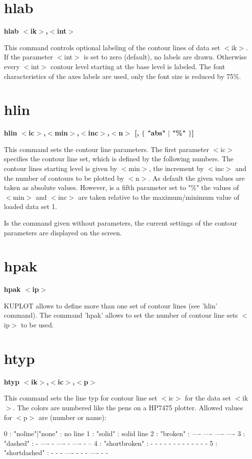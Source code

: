 \section{hlab}
{\bf hlab $ <$ik$> $,$ <$int$> $ \par }
\par
\vspace{3pt}
This command controls optional labeling of the contour lines of 
data set $ <$ik$> $. If the parameter $ <$int$> $ is set to zero (default), no 
labels are drawn. Otherwise every $ <$int$> $ contour level starting at 
the base level is labeled. The font characteristics of the axes 
labels are used, only the font size is reduced by 75\%. 
\section{hlin}
{\bf hlin $ <$ic$> $,$ <$min$> $,$ <$inc$> $,$ <$n$> $ [, $ \{$ "abs" $| $ "\%" $\} $] \par }
\par
\vspace{3pt}
This command sets the contour line parameters. The first parameter 
$ <$ic$> $ specifies the contour line set, which is defined by the following 
numbers. The contour lines starting level is given by $ <$min$> $, the 
increment by $ <$inc$> $ and the number of contours to be plotted by $ <$n$> $. 
As default the given values are taken as absolute values. However, 
is a fifth parameter set to "\%" the values of $ <$min$> $ and $ <$inc$> $ are 
taken relative to the maximum/minimum value of loaded data set 1. 
\par
Is the command given without parameters, the current settings of the 
contour parameters are displayed on the screen. 
\section{hpak}
{\bf hpak $ <$ip$> $ \par }
\par
\vspace{3pt}
KUPLOT allows to define more than one set of contour lines (see 'hlin' 
command). The command 'hpak' allows to set the number of contour line 
sets $ <$ip$> $ to be used. 
\section{htyp}
{\bf htyp $ <$ik$> $,$ <$ic$> $,$ <$p$> $ \par }
\par
\vspace{3pt}
This command sets the line typ for contour line set $ <$ic$> $ for the data 
set $ <$ik$> $. The colors are numbered like the pens on a HP7475 plotter. 
Allowed values for $ <$p$> $ are (number or name): 
\par
\begin{MacVerbatim}
  0 : {"noline"|"none"} : no line
  1 :  "solid"          : solid line
  2 :  "broken"         : ----   ----   ----   ----
  3 :  "dashed"         : - ---- - ---- - ---- - --
  4 :  "shortbroken"    : - - - - - - - - - - - - -
  5 :  "shortdashed"    : - - - ---- - - - ---- - -
\end{MacVerbatim}
